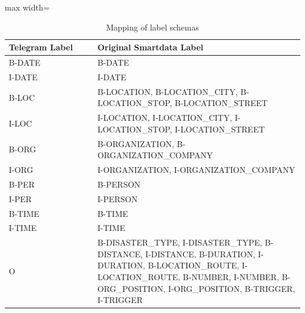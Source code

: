 \begin{table}[h]
\caption{Mapping of label schemas}
\label{tab:label_mapping}
\centering
\begin{adjustbox}{max width=\textwidth}
\begin{tabular}{|p{0.3\linewidth}|p{0.7\linewidth}|}
\hline
\textbf{Telegram Label} & \textbf{Original Smartdata Label} \\
\hline 
B-DATE & B-DATE\\ \hline
I-DATE & I-DATE\\ \hline
B-LOC & B-LOCATION, B-LOCATION\_CITY, \newline B-LOCATION\_STOP, 
 B-LOCATION\_STREET  \\ \hline
I-LOC & I-LOCATION, I-LOCATION\_CITY, \newline I-LOCATION\_STOP, I-LOCATION\_STREET \\ \hline
B-ORG & B-ORGANIZATION, \newline B-ORGANIZATION\_COMPANY \\ \hline
I-ORG & I-ORGANIZATION, \newline I-ORGANIZATION\_COMPANY \\ \hline
B-PER & B-PERSON \\ \hline
I-PER & I-PERSON \\ \hline
B-TIME & B-TIME \\ \hline
I-TIME & I-TIME \\ \hline
O & B-DISASTER\_TYPE, I-DISASTER\_TYPE, \newline B-DISTANCE, I-DISTANCE, \newline B-DURATION, I-DURATION, \newline B-LOCATION\_ROUTE, I-LOCATION\_ROUTE, \newline B-NUMBER, I-NUMBER, \newline B-ORG\_POSITION, I-ORG\_POSITION, \newline B-TRIGGER, I-TRIGGER \\ \hline
\end{tabular}
\end{adjustbox}
\end{table}
